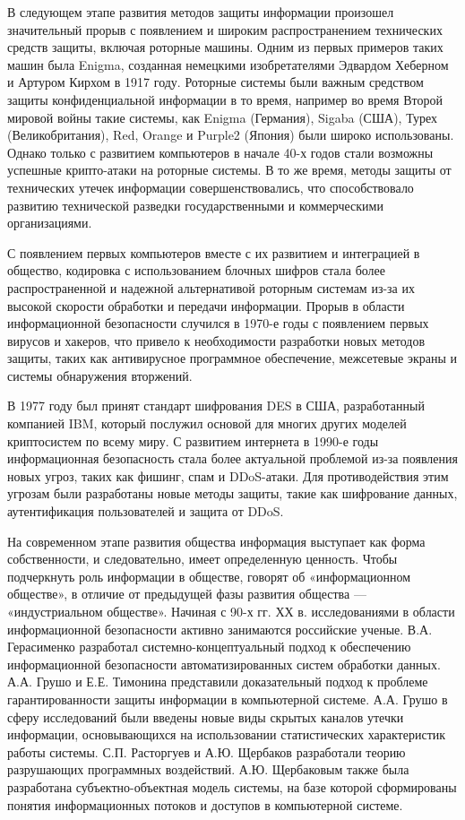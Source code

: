 
В следующем этапе развития методов защиты информации произошел значительный прорыв с появлением и широким распространением 
технических средств защиты, включая роторные машины. Одним из первых примеров таких машин была Enigma, созданная немецкими 
изобретателями Эдвардом Хеберном и Артуром Кирхом в 1917 году. Роторные системы были важным средством защиты конфиденциальной 
информации в то время, например во время Второй мировой войны такие системы, как Enigma (Германия), Sigaba (США), Турех 
(Великобритания), Red, Orange и Purple2 (Япония) были широко использованы. Однако только с развитием компьютеров в начале 
40-х годов стали возможны успешные крипто-атаки на роторные системы. В то же время, методы защиты от технических утечек 
информации совершенствовались, что способствовало развитию технической разведки государственными и коммерческими 
организациями.

С появлением первых компьютеров вместе с их развитием и интеграцией в общество, кодировка с использованием блочных шифров стала более распространенной и надежной альтернативой роторным системам из-за их высокой скорости обработки и передачи 
информации. Прорыв в области информационной безопасности случился в 1970-е годы с появлением первых вирусов и хакеров, что 
привело к необходимости разработки новых методов защиты, таких как антивирусное программное обеспечение, межсетевые экраны и 
системы обнаружения вторжений.

В 1977 году был принят стандарт шифрования DES в США, разработанный компанией IBM, который послужил основой для многих других 
моделей криптосистем по всему миру. С развитием интернета в 1990-е годы информационная безопасность стала более актуальной 
проблемой из-за появления новых угроз, таких как фишинг, спам и DDoS-атаки. Для противодействия этим угрозам были разработаны 
новые методы защиты, такие как шифрование данных, аутентификация пользователей и защита от DDoS.

На современном этапе развития общества информация выступает как форма собственности, и следовательно, имеет определенную 
ценность. Чтобы подчеркнуть роль информации в обществе, говорят об «информационном обществе», в отличие от предыдущей фазы 
развития общества — «индустриальном обществе». Начиная с 90-х гг. ХХ в. исследованиями в области информационной безопасности 
активно занимаются российские ученые. В.А. Герасименко разработал системно-концептуальный подход к обеспечению информационной 
безопасности автоматизированных систем обработки данных. А.А. Грушо и Е.Е. Тимонина представили доказательный подход к 
проблеме гарантированности защиты информации в компьютерной системе. А.А. Грушо в сферу исследований были введены новые виды 
скрытых каналов утечки информации, основывающихся на использовании статистических характеристик работы системы. С.П. 
Расторгуев и А.Ю. Щербаков разработали теорию разрушающих программных воздействий. А.Ю. Щербаковым также была разработана 
субъектно-объектная модель системы, на базе которой сформированы понятия информационных потоков и доступов в компьютерной 
системе. 

